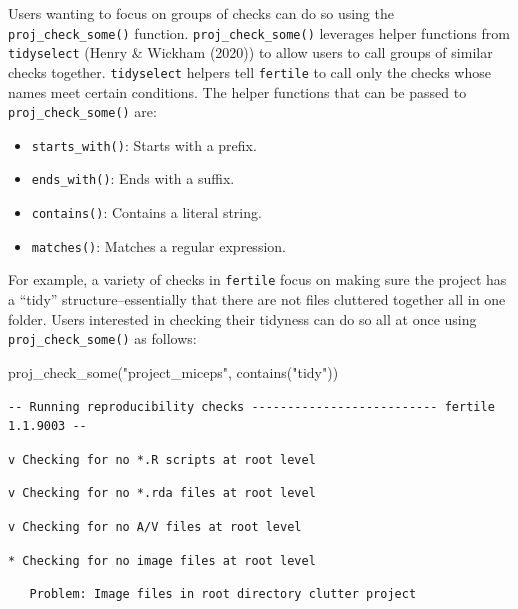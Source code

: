 \documentclass[12pt,twoside]{reedthesis}
\newenvironment{Shaded}{\begin{snugshade}}{\end{snugshade}}
\newcommand{\FunctionTok}[1]{\textcolor[rgb]{0.00,0.00,0.00}{#1}}
\newcommand{\NormalTok}[1]{#1}
\newcommand{\StringTok}[1]{\textcolor[rgb]{0.31,0.60,0.02}{#1}}
\providecommand{\tightlist}{%
  \setlength{\itemsep}{0pt}\setlength{\parskip}{0pt}}
\begin{document}
Users wanting to focus on groups of checks can do so using the \texttt{proj\_check\_some()} function.
\texttt{proj\_check\_some()} leverages helper functions from \texttt{tidyselect} (Henry \& Wickham (2020)) to allow users to call groups of similar checks together. \texttt{tidyselect} helpers tell \texttt{fertile} to call only the checks whose names meet certain conditions. The helper functions that can be passed to \texttt{proj\_check\_some()} are:
\begin{itemize}
\tightlist
\item
  \texttt{starts\_with()}: Starts with a prefix.
\item
  \texttt{ends\_with()}: Ends with a suffix.
\item
  \texttt{contains()}: Contains a literal string.
\item
  \texttt{matches()}: Matches a regular expression.
\end{itemize}
For example, a variety of checks in \texttt{fertile} focus on making sure the project has a ``tidy'' structure--essentially that there are not files cluttered together all in one folder. Users interested in checking their tidyness can do so all at once using \texttt{proj\_check\_some()} as follows:
\begin{Shaded}
\begin{Highlighting}[]
\FunctionTok{proj\_check\_some}\NormalTok{(}\StringTok{"project\_miceps"}\NormalTok{, }\FunctionTok{contains}\NormalTok{(}\StringTok{"tidy"}\NormalTok{))}
\end{Highlighting}
\end{Shaded}
\footnotesize
\begin{verbatim}
-- Running reproducibility checks -------------------------- fertile 1.1.9003 --
\end{verbatim}
\begin{verbatim}
v Checking for no *.R scripts at root level
\end{verbatim}
\begin{verbatim}
v Checking for no *.rda files at root level
\end{verbatim}
\begin{verbatim}
v Checking for no A/V files at root level
\end{verbatim}
\begin{verbatim}
* Checking for no image files at root level
\end{verbatim}
\begin{verbatim}
   Problem: Image files in root directory clutter project
\end{verbatim}
\end{document}
